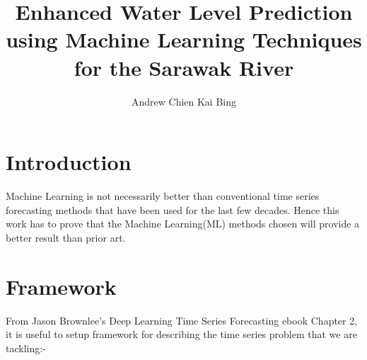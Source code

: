 \documentclass[10pt,a4paper,draft]{article}
\title{Enhanced Water Level Prediction using Machine Learning Techniques for the Sarawak River}
\author{Andrew Chien Kai Bing}
\begin{document}
	\section{Introduction}
	Machine Learning is not necessarily better than conventional time series forecasting methods that have been used for the last few decades. Hence this work has to prove that the Machine Learning(ML) methods chosen will provide a better result than prior art. 
	
	\section{Framework}
	From Jason Brownlee's Deep Learning Time Series Forecasting ebook \cite{JasonBrown} Chapter 2, it is useful to setup framework for describing the time series problem that we are tackling:-
	
\end{document}
